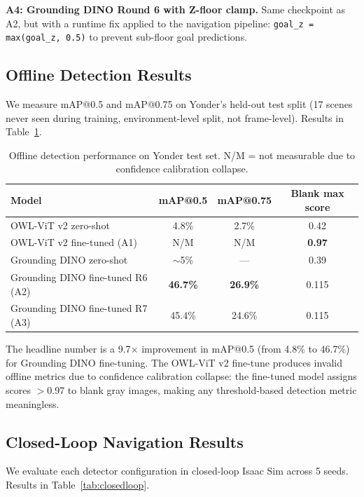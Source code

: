 \documentclass{article}
\begin{document}
\textbf{A4: Grounding DINO Round 6 with Z-floor clamp.} Same checkpoint as A2, but with a runtime fix applied to the navigation pipeline: \verb|goal_z = max(goal_z, 0.5)| to prevent sub-floor goal predictions.

\subsection{Offline Detection Results}

We measure mAP@0.5 and mAP@0.75 on Yonder's held-out test split (17 scenes never seen during training, environment-level split, not frame-level). Results in Table~\ref{tab:offline}.

\begin{table}[h]
\centering
\caption{Offline detection performance on Yonder test set. N/M = not measurable due to confidence calibration collapse.}
\label{tab:offline}
\begin{tabular}{lccc}
\toprule
Model & mAP@0.5 & mAP@0.75 & Blank max score \\
\midrule
OWL-ViT v2 zero-shot & 4.8\% & 2.7\% & 0.42 \\
OWL-ViT v2 fine-tuned (A1) & N/M & N/M & \textbf{0.97} \\
Grounding DINO zero-shot & $\sim$5\% & --- & 0.39 \\
Grounding DINO fine-tuned R6 (A2) & \textbf{46.7\%} & \textbf{26.9\%} & 0.115 \\
Grounding DINO fine-tuned R7 (A3) & 45.4\% & 24.6\% & 0.115 \\
\bottomrule
\end{tabular}
\end{table}

The headline number is a 9.7$\times$ improvement in mAP@0.5 (from 4.8\% to 46.7\%) for Grounding DINO fine-tuning. The OWL-ViT v2 fine-tune produces invalid offline metrics due to confidence calibration collapse: the fine-tuned model assigns scores $>$0.97 to blank gray images, making any threshold-based detection metric meaningless.

\subsection{Closed-Loop Navigation Results}

We evaluate each detector configuration in closed-loop Isaac Sim across 5 seeds. Results in Table~\ref{tab:closedloop}.
\end{document}
